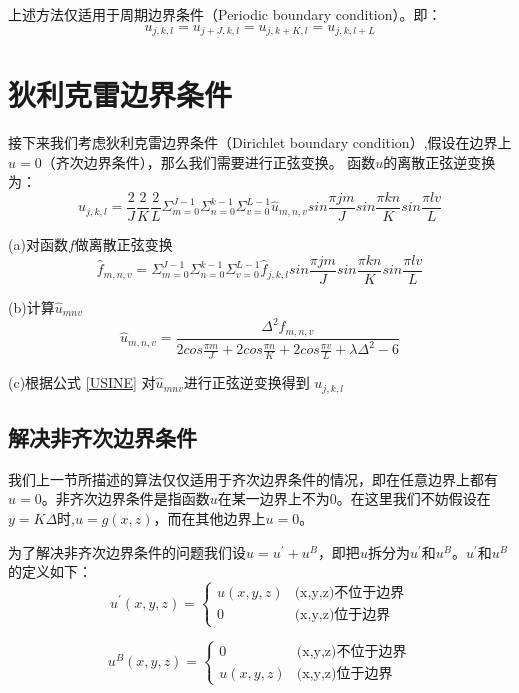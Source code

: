 上述方法仅适用于周期边界条件（Periodic boundary condition）。即：
$$
u_{j,k,l} = u_{j+J,k,l} = u_{j,k+K,l} = u_{j,k,l+L}
$$


\section{狄利克雷边界条件}

接下来我们考虑狄利克雷边界条件（Dirichlet boundary condition）,假设在边界上$u=0$（齐次边界条件），那么我们需要进行正弦变换。  
函数$u$的离散正弦逆变换为：
\begin{equation} \label{USINE}
u_{j,k,l}=\frac{2}{J}\frac{2}{K}\frac{2}{L}\Sigma_{m=0}^{J-1}\Sigma_{n=0}^{k-1}\Sigma_{v=0}^{L-1}
\hat{u}_{m,n,v}sin\frac{\pi jm}{J}sin\frac{\pi kn}{K}sin\frac{\pi lv}{L}
\end{equation}  

(a)对函数$f$做离散正弦变换
\begin{equation}
\hat{f}_{m,n,v}=\Sigma_{m=0}^{J-1}\Sigma_{n=0}^{k-1}\Sigma_{v=0}^{L-1}
\hat{f}_{j,k,l}sin\frac{\pi jm}{J}sin\frac{\pi kn}{K}sin\frac{\pi lv}{L}
\end{equation}  

(b)计算$\hat{u}_{mnv}$
\begin{equation} \label{UMNV2}
\hat{u}_{m,n,v}= \frac{\Delta^2 \hat{f}_{m,n,v}}
{2cos\frac{\pi m}{J}+2cos\frac{\pi n}{K}+2cos\frac{\pi v}{L} + \lambda \Delta^2 - 6}
\end{equation} 

(c)根据公式 \eqref{USINE} 对$\hat{u}_{mnv}$进行正弦逆变换得到 $u_{j,k,l}$

\subsection{解决非齐次边界条件}
我们上一节所描述的算法仅仅适用于齐次边界条件的情况，即在任意边界上都有$u=0$。非齐次边界条件是指函数$u$在某一边界上不为0。在这里我们不妨假设在$y=K\Delta$时,$u=g(x,z)$，而在其他边界上$u=0$。  

为了解决非齐次边界条件的问题我们设$u = u^{'} + u^{B}$，即把$u$拆分为$ u^{'}$和$u^{B}$。$ u^{'}$和$u^{B}$的定义如下：
$$
u^{'}(x,y,z)=
\begin{cases}
u(x,y,z) &  \text{(x,y,z)不位于边界}\\
0 &  \text{(x,y,z)位于边界}
\end{cases}
$$

$$
u^{B}(x,y,z)=
\begin{cases}
0 &  \text{(x,y,z)不位于边界}\\
u(x,y,z) &  \text{(x,y,z)位于边界}
\end{cases}
$$  

